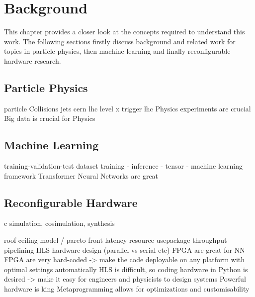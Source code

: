 \chapter{Background}

This chapter provides a closer look at the concepts required to understand this work. The following sections firstly discuss background and related work for topics in particle physics, then machine learning and finally reconfigurable hardware research.

\section{Particle Physics}




particle Collisions 
jets
cern
lhc
level x trigger lhc
Physics experiments are crucial
Big data is crucial for Physics


\section{Machine Learning}



training-validation-test dataset
training - 
inference - 
tensor -
machine learning framework
Transformer Neural Networks are great


\section{Reconfigurable Hardware}



c simulation, cosimulation, synthesis

roof ceiling model / pareto front
latency
resource usepackage
throughput
pipelining
HLS
hardware design (parallel vs serial etc)
FPGA are great for NN
FPGA are very hard-coded -> make the code deployable on any platform with optimal settings automatically
HLS is difficult, so coding hardware in Python is desired -> make it easy for engineers and physicists to design systems
Powerful hardware is king
Metaprogramming allows for optimizations and customisability

